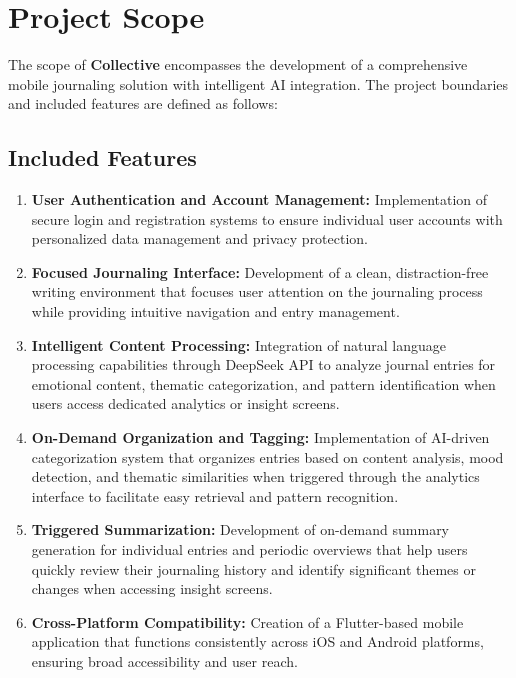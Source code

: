 \section{Project Scope}\label{sec:scope}

The scope of \textbf{Collective} encompasses the development of a comprehensive mobile journaling solution with intelligent AI integration. The project boundaries and included features are defined as follows:

\subsection{Included Features}\label{subsec:included-features}

\begin{enumerate}
	\item \textbf{User Authentication and Account Management:} Implementation of secure login and registration systems to ensure individual user accounts with personalized data management and privacy protection.
	
	\item \textbf{Focused Journaling Interface:} Development of a clean, distraction-free writing environment that focuses user attention on the journaling process while providing intuitive navigation and entry management.
	
	\item \textbf{Intelligent Content Processing:} Integration of natural language processing capabilities through DeepSeek API to analyze journal entries for emotional content, thematic categorization, and pattern identification when users access dedicated analytics or insight screens.
	
	\item \textbf{On-Demand Organization and Tagging:} Implementation of AI-driven categorization system that organizes entries based on content analysis, mood detection, and thematic similarities when triggered through the analytics interface to facilitate easy retrieval and pattern recognition.
	
	\item \textbf{Triggered Summarization:} Development of on-demand summary generation for individual entries and periodic overviews that help users quickly review their journaling history and identify significant themes or changes when accessing insight screens.
	
	\item \textbf{Cross-Platform Compatibility:} Creation of a Flutter-based mobile application that functions consistently across iOS and Android platforms, ensuring broad accessibility and user reach.
	

\end{enumerate}
